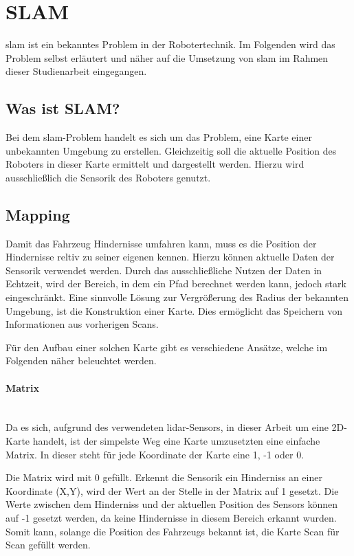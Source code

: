 \section{SLAM}
\ac{slam} ist ein bekanntes Problem in der Robotertechnik. 
Im Folgenden wird das Problem selbst erläutert und näher auf die Umsetzung von \ac{slam} im Rahmen dieser Studienarbeit eingegangen.

\subsection{Was ist SLAM?}
Bei dem \ac{slam}-Problem handelt es sich um das Problem, eine Karte einer unbekannten Umgebung zu erstellen.
Gleichzeitig soll die aktuelle Position des Roboters in dieser Karte ermittelt und dargestellt werden.
Hierzu wird ausschließlich die Sensorik des Roboters genutzt.

\subsection{Mapping}
Damit das Fahrzeug Hindernisse umfahren kann, muss es die Position der Hindernisse reltiv zu seiner eigenen kennen.
Hierzu können aktuelle Daten der Sensorik verwendet werden.
Durch das ausschließliche Nutzen der Daten in Echtzeit, wird der Bereich, in dem ein Pfad berechnet werden kann, jedoch stark eingeschränkt.
Eine sinnvolle Lösung zur Vergrößerung des Radius der bekannten Umgebung, ist die Konstruktion einer Karte.
Dies ermöglicht das Speichern von Informationen aus vorherigen Scans.

Für den Aufbau einer solchen Karte gibt es verschiedene Ansätze, welche im Folgenden näher beleuchtet werden.

\paragraph{Matrix} \mbox{}\\
Da es sich, aufgrund des verwendeten \ac{lidar}-Sensors, in dieser Arbeit um eine 2D-Karte handelt, 
ist der simpelste Weg eine Karte umzusetzten eine einfache Matrix.
In dieser steht für jede Koordinate der Karte eine 1, -1 oder 0.

Die Matrix wird mit 0 gefüllt.
Erkennt die Sensorik ein Hinderniss an einer Koordinate (X,Y), wird der Wert an der Stelle in der Matrix auf 1 gesetzt.
Die Werte zwischen dem Hinderniss und der aktuellen Position des Sensors können auf -1 gesetzt werden,
da keine Hindernisse in diesem Bereich erkannt wurden.
Somit kann, solange die Position des Fahrzeugs bekannt ist, die Karte Scan für Scan gefüllt werden.

